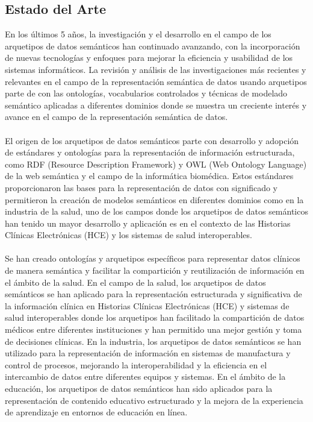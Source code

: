 \documentclass[12pt,a4paper]{article}
\begin{document}
\subsection{Estado del Arte}
\label{sec:7}
En los últimos 5 años, la investigación y el desarrollo en el campo de los arquetipos de datos semánticos han continuado avanzando, con la incorporación de nuevas tecnologías y enfoques para mejorar la eficiencia y usabilidad de los sistemas informáticos. La revisión y análisis de las investigaciones más recientes y relevantes en el campo de la representación semántica de datos usando arquetipos parte de con las ontologías, vocabularios controlados y técnicas de modelado semántico aplicadas a diferentes dominios donde se muestra un creciente interés y avance en el campo de la representación semántica de datos.
\\\\
El origen de los arquetipos de datos semánticos parte con desarrollo y adopción de estándares y ontologías para la representación de información estructurada, como RDF (Resource Description Framework) y OWL (Web Ontology Language) de la web semántica y el campo de la informática biomédica. Estos estándares proporcionaron las bases para la representación de datos con significado y permitieron la creación de modelos semánticos en diferentes dominios como en la industria de la salud, uno de los campos donde los arquetipos de datos semánticos han tenido un mayor desarrollo y aplicación es en el contexto de las Historias Clínicas Electrónicas (HCE) y los sistemas de salud interoperables. 
\\\\
Se han creado ontologías y arquetipos específicos para representar datos clínicos de manera semántica y facilitar la compartición y reutilización de información en el ámbito de la salud. En el campo de la salud, los arquetipos de datos semánticos se han aplicado para la representación estructurada y significativa de la información clínica en Historias Clínicas Electrónicas (HCE) y sistemas de salud interoperables donde los arquetipos han facilitado la compartición de datos médicos entre diferentes instituciones y han permitido una mejor gestión y toma de decisiones clínicas. En la industria, los arquetipos de datos semánticos se han utilizado para la representación de información en sistemas de manufactura y control de procesos, mejorando la interoperabilidad y la eficiencia en el intercambio de datos entre diferentes equipos y sistemas. En el ámbito de la educación, los arquetipos de datos semánticos han sido aplicados para la representación de contenido educativo estructurado y la mejora de la experiencia de aprendizaje en entornos de educación en línea.
\end{document}
